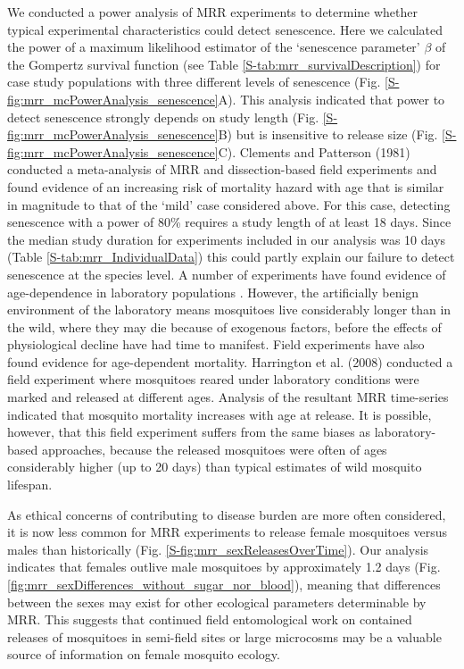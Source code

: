 \documentclass[]{article}
\begin{document}
We conducted a power analysis of MRR experiments to determine
whether typical experimental characteristics could detect senescence.
Here we calculated the power of a maximum likelihood estimator of the
`senescence parameter' $\beta$ of the Gompertz survival function (see Table
\ref{S-tab:mrr_survivalDescription}) for case study populations with three different levels of
senescence (Fig. \ref{S-fig:mrr_mcPowerAnalysis_senescence}A). This analysis indicated that power to detect
senescence strongly depends on study length (Fig. \ref{S-fig:mrr_mcPowerAnalysis_senescence}B) but is
insensitive to release size (Fig. \ref{S-fig:mrr_mcPowerAnalysis_senescence}C). Clements and Patterson (1981)
conducted a meta-analysis of MRR and dissection-based field experiments
and found evidence of an increasing risk of mortality hazard with age
that is similar in magnitude to that of the `mild' case considered
above. For this case, detecting senescence with a power of 80\% requires
a study length of at least 18 days. Since the median study duration for
experiments included in our analysis was 10 days (Table \ref{S-tab:mrr_IndividualData}) this could
partly explain our failure to detect senescence at the species level. A
number of experiments have found evidence of age-dependence in
laboratory populations \citep{styer2007mosquitoes,dawes2009anopheles}.
However, the artificially benign environment of the laboratory means
mosquitoes live considerably longer than in the wild, where they may die
because of exogenous factors, before the effects of physiological
decline have had time to manifest. Field experiments have also found
evidence for age-dependent mortality. Harrington et al. (2008) conducted
a field experiment where mosquitoes reared under laboratory conditions
were marked and released at different ages. Analysis of the resultant
MRR time-series indicated that mosquito mortality increases with age at
release. It is possible, however, that this field experiment suffers
from the same biases as laboratory-based approaches, because the
released mosquitoes were often of ages considerably higher (up to 20
days) than typical estimates of wild mosquito lifespan.

As ethical concerns of contributing to disease burden are more often
considered, it is now less common for MRR experiments to release female
mosquitoes versus males than historically (Fig. \ref{S-fig:mrr_sexReleasesOverTime}). Our analysis
indicates that females outlive male mosquitoes by approximately 1.2 days
(Fig. \ref{fig:mrr_sexDifferences_without_sugar_nor_blood}), meaning that differences between the sexes may exist for
other ecological parameters determinable by MRR. This suggests that
continued field entomological work on contained releases of mosquitoes
in semi-field sites or large microcosms may be a valuable source of
information on female mosquito ecology.
\end{document}
